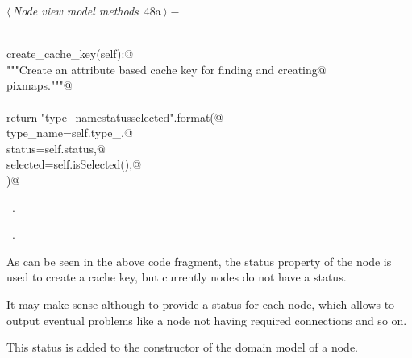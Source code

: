 \documentclass[
    a4paper,      %
    10pt,         %
    openright,    %
    notitlepage,  %
    parskip=half, %
]{scrreprt}       %
\theoremstyle{definition}                    %
\begin{document}
\begin{flushleft} \small
\begin{minipage}{\linewidth}\label{scrap66}\raggedright\small
{} $\langle\,${\itshape Node view model methods}\nobreak\ {\footnotesize {48a}}$\,\rangle\equiv$
\vspace{-1ex}
\begin{list}{}{} \item
\mbox{}\lstinline@@\\
\mbox{}\lstinline@def create_cache_key(self):@\\
\mbox{}\lstinline@    """Create an attribute based cache key for finding and creating@\\
\mbox{}\lstinline@    pixmaps."""@\\
\mbox{}\lstinline@@\\
\mbox{}\lstinline@    return "{type_name}{status}{selected}".format(@\\
\mbox{}\lstinline@        type_name=self.type_,@\\
\mbox{}\lstinline@        status=self.status,@\\
\mbox{}\lstinline@        selected=self.isSelected(),@\\
\mbox{}\lstinline@    )@\\
\mbox{}\lstinline@@{\NWsep}
\end{list}
\vspace{-1.5ex}
\footnotesize
\begin{list}{}{\setlength{\itemsep}{-\parsep}\setlength{\itemindent}{-\leftmargin}}
\item \NWtxtMacroDefBy\ .
\item \NWtxtMacroRefIn\ .

\item{}
\end{list}
\end{minipage}\vspace{4ex}
\end{flushleft}
As can be seen in the above code fragment, the status property of the node is
used to create a cache key, but currently nodes do not have a status.

It may make sense although to provide a status for each node, which allows to
output eventual problems like a node not having required connections and so on.

This status is added to the constructor of the domain model of a node.
\end{document}
